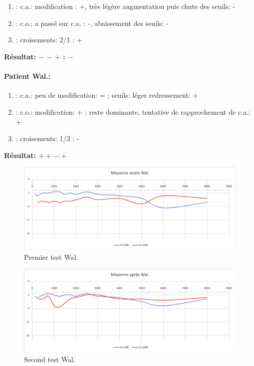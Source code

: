 \begin{enumerate}
	
	\item : c.a.:  modification : +, très légère augmentation puis chute des
	seuils: -
	\item : c.o.: a passé sur c.a. : -, abaissement des seuils:  -
	\item : croisements: 2/1 :     +
\end{enumerate}
\textbf{ Résultat:  $-$    $-$   $+$         :   $-$ }

 \clearpage

\paragraph{ Patient Wal.:}


	\begin{enumerate}

 		\item : c.a.: peu de modification: = ;  seuils: léger redressement: +

 		\item : c.o.:  modification:  + ; reste dominante, tentative de rapprochement de c.a.: +
 		\item : croisements: 1/3 :  -

                \end{enumerate}

                \textbf{ Résultat:  $ + +  -        : +$ }
\begin{figure}[th]
	\centering
	\includegraphics[width=1\linewidth]{images/graphiques/wal_pre.png}
	\caption[Patient Wal. :1° test]{Premier test Wal.}
	
\end{figure}
               \begin{figure}%
\centering
\includegraphics[width=1\linewidth]{images/graphiques/wal_post.png}
\caption[Patient Wal. : 2° test]{Second test Wal.}

\label{groupecontroleimage1}
\end{figure}







